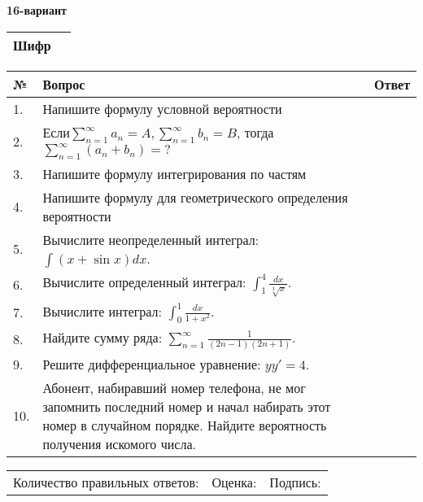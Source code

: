 \documentclass{article}
\begin{document}
  \egroup
  
  \newpage
  
  
  \textbf{16-вариант}\\
  
  \bgroup
  \def\arraystretch{1.6} %
  
  \begin{tabular}{|m{5.7cm}|m{9.5cm}|}
  \hline
  Шифр & \\
  \hline
  \end{tabular}
  
  \vspace{1cm}
  
  \begin{tabular}{|m{0.7cm}|m{10cm}|m{4cm}|}
  \hline
  № & Вопрос & Ответ \\
  \hline
  1. & Напишите формулу условной вероятности &  \\
  \hline
  2. & Если\(\sum_{n = 1}^{\infty}a_{n} = A,\sum_{n = 1}^{\infty}b_{n} = B\), тогда \(\sum_{n = 1}^{\infty}\left( a_{n} + b_{n} \right) = ?\) &  \\
  \hline
  3. & Напишите формулу интегрирования по частям &  \\
  \hline
  4. & Напишите формулу для геометрического определения вероятности &  \\
  \hline
  5. & Вычислите неопределенный интеграл: \(\int{(x + \sin x)}dx\). &  \\
  \hline
  6. & Вычислите определенный интеграл: \(\int_{1}^{4}\frac{dx}{\sqrt[3]{x}}\). &  \\
  \hline
  7. & Вычислите интеграл: \(\int_{0}^{1}\frac{dx}{1 + x^{2}}\). &  \\
  \hline
  8. & Найдите сумму ряда: \(\sum_{n = 1}^{\infty}\frac{1}{(2n - 1)(2n + 1)}\). &  \\
  \hline
  9. & Решите дифференциальное уравнение: \(yy' = 4\). &  \\
  \hline
  10. & Абонент, набиравший номер телефона, не мог запомнить последний номер и начал набирать этот номер в случайном порядке. Найдите вероятность получения искомого числа. &  \\
  \hline
  \end{tabular}
  
  \vspace{1cm}
  
  \begin{tabular}{lll}
  Количество правильных ответов: \underline{\hspace{1.5cm}} & 
  Оценка: \underline{\hspace{1.5cm}} & 
  Подпись: \underline{\hspace{2cm}} \\
  \end{tabular}
  
\end{document}
